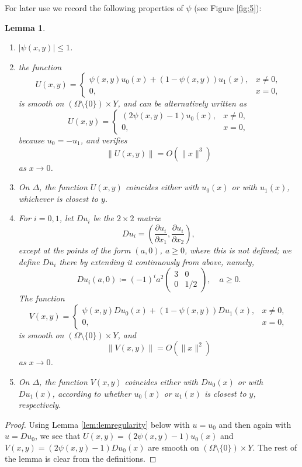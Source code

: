 \documentclass{article}
\newtheorem{lemma}[theorem]{Lemma}
\theoremstyle{definition}
\theoremstyle{remark}
\newcommand{\uu}{u}
\begin{document}
For later use we record the following properties of $\psi$ (see Figure \ref{fig:5}):
\begin{lemma}\label{lem:psi}
\begin{enumerate}[label=\roman*.,ref=(\roman*)]
    \item \label{it:psibound}$ |\psi(x,y)|\leq 1$.
    \item \label{it:Usmooth} the function
\[U(x,y)=\begin{cases}\psi(x,y)\uu_0(x)+(1-\psi(x,y))\uu_1(x),&x\neq 0,\\
0,&x=0,
\end{cases}\]
is smooth on $(\Omega\setminus\{0\})\times Y$, and can be alternatively written as
    \[U(x,y)=\begin{cases} (2\psi(x,y)-1)\uu_0(x), & x\neq 0,\\
    0,&x=0,
    \end{cases}\]
    because $\uu_0=-\uu_1$, and verifies
    \[\|U(x,y)\|=O(\|x\|^3)\]
    as $x\to 0$.
    \item \label{it:Utrivial} On $\Delta$, the function $U(x,y)$ coincides either with $\uu_0(x)$ or with $\uu_1(x)$, whichever is closest to $y$. 
    \item \label{it:Vsmooth} For $i=0,1$, let $D\uu_i$ be the $2\times 2$ matrix
\[D\uu_i=\left(\frac{\partial \uu_i}{\partial x_1} , \frac{\partial \uu_i}{\partial x_2}\right),\]
except at the points of the form $(a,0)$, $a\geq0$, where this is not defined; we define $D\uu_i$ there by extending it continuously from above, namely, 
\begin{equation*}\label{eq:defDu}D\uu_i(a,0)\coloneqq(-1)^ia^2\begin{pmatrix}
 3& 0\\ 0&1/2
\end{pmatrix},\quad a\geq0.
\end{equation*}
The function \[
    V(x,y)=\begin{cases}
      \psi(x,y)D\uu_0(x)+(1-\psi(x,y))D\uu_1(x),&x\neq 0,\\
      0,&x=0,
    \end{cases}
    \]
    is smooth on $(\Omega\setminus\{0\})\times Y$, and 
    \[\|V(x,y)\|=O(\|x\|^2)\]
    as $x\to 0$.
    \item \label{it:Vtrivial} On $\Delta$, the function $V(x,y)$ coincides either with $D\uu_0(x)$ or with $D\uu_1(x)$, according to whether $\uu_0(x)$ or $\uu_1(x)$ is closest to $y$, respectively.
\end{enumerate}
\end{lemma}
\begin{proof}
 Using Lemma \ref{lem:lemregularity} below with $u=\uu_0$ and then again with $u=D\uu_0$, we see that $U(x,y)=(2\psi(x,y)-1)\uu_0(x)$ and $V(x,y)=(2\psi(x,y)-1)D\uu_0(x)$ are smooth on $(\Omega\setminus\{0\})\times Y$. The rest of the lemma is clear from the definitions.
\end{proof}
\end{document}

